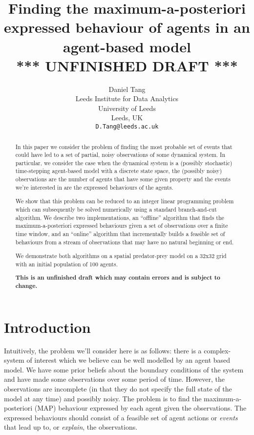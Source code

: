\documentclass{article}
\title{Finding the maximum-a-posteriori expressed behaviour of agents in an agent-based model\\
*** UNFINISHED DRAFT ***}
\author{
  Daniel Tang\\
  Leeds Institute for Data Analytics\\
  University of Leeds\\
  Leeds, UK\\
  \texttt{D.Tang@leeds.ac.uk} \\
}
\begin{document}
\maketitle

\begin{abstract}
In this paper we consider the problem of finding the most probable set of events that could have led to a set of partial, noisy observations of some dynamical system. In particular, we consider the case when the dynamical system is a (possibly stochastic) time-stepping agent-based model with a discrete state space, the  (possibly noisy) observations are the number of agents that have some given property and the events we're interested in are the expressed behaviours of the agents.

We show that this problem can be reduced to an integer linear programming problem which can subsequently be solved numerically using a standard branch-and-cut algorithm. We describe two implementations, an ``offline'' algorithm that finds the maximum-a-posteriori expressed behaviours given a set of observations over a finite time window, and an ``online'' algorithm that incrementally builds a feasible set of behaviours from a stream of observations that may have no natural beginning or end.

We demonstrate both algorithms on a spatial predator-prey model on a 32x32 grid with an initial population of 100 agents.

\textbf{This is an unfinished draft which may contain errors and is subject to change.}
\end{abstract}


\section{Introduction}

Intuitively, the problem we'll consider here is as follows: there is a complex-system of interest which we believe can be well modelled by an agent based model. We have some prior beliefs about the boundary conditions of the system and have made some observations over some period of time. However, the observations are incomplete (in that they do not specify the full state of the model at any time) and possibly noisy. The problem is to find the maximum-a-posteriori (MAP) behaviour expressed by each agent given the observations. The expressed behaviours should consist of a feasible set of agent actions or \textit{events} that lead up to, or \textit{explain}, the observations.
\end{document}
